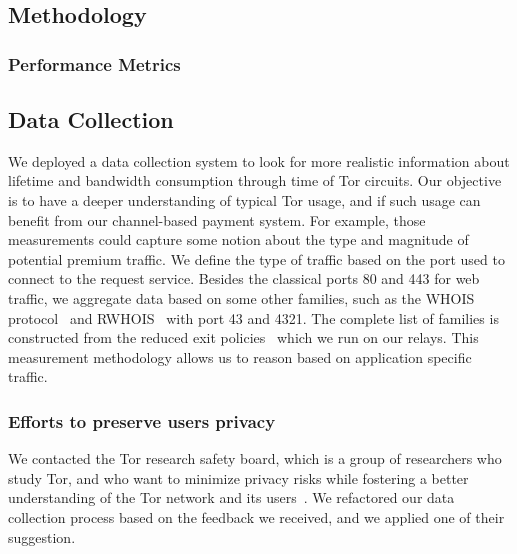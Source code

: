 \subsection{Methodology}

\subsubsection{Performance Metrics}
\subsection{Data Collection}
\label{subsec:datacollection}

We deployed a data collection system to look for more realistic information about lifetime and bandwidth consumption through time of Tor circuits. Our objective is to have a deeper understanding of typical Tor usage, and if such usage can benefit from our channel-based payment system. For example, those measurements could capture some notion about the type and magnitude of potential premium traffic. We define the type of traffic based on the port used to connect to the request service. Besides the classical ports 80 and 443 for web traffic, we aggregate data based on some other families, such as the WHOIS protocol~\cite{rfc3912} and RWHOIS~\cite{rfc2167} with port 43 and 4321. The complete list of families is constructed from the reduced exit policies~\cite{reducedexitpolicies} which we run on our relays. This measurement methodology allows us to reason based on application specific traffic.

\subsubsection{Efforts to preserve users privacy}

We contacted the Tor research safety board, which is a group of researchers who study Tor, and who want to minimize privacy risks while fostering a better understanding of the Tor network and its users~\cite{torsafety}. We refactored our data collection process based on the feedback we received, and we applied one of their suggestion.


